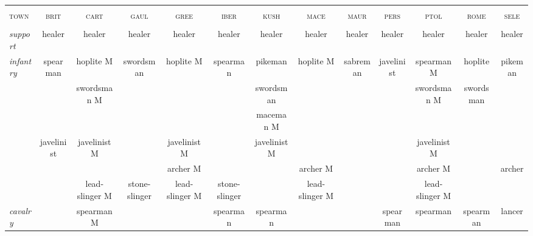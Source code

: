 \documentclass{article}
\newcommand{\brit}{\textsc{\color{blue} brit}}
\newcommand{\cart}{\textsc{\color{blue} cart}}
\newcommand{\gaul}{\textsc{\color{blue} gaul}}
\newcommand{\gree}{\textsc{\color{blue} gree}}
\newcommand{\iber}{\textsc{\color{blue} iber}}
\newcommand{\kush}{\textsc{\color{blue} kush}}
\newcommand{\mace}{\textsc{\color{blue} mace}}
\newcommand{\maur}{\textsc{\color{blue} maur}}
\newcommand{\pers}{\textsc{\color{blue} pers}}
\newcommand{\ptol}{\textsc{\color{blue} ptol}}
\newcommand{\rome}{\textsc{\color{blue} rome}}
\newcommand{\sele}{\textsc{\color{blue} sele}}
\newcommand{\town}{\textsc{\color{blue} town}}
\begin{document}
\begin{landscape}
\begin{tabular}{l||c|c|c|c||c|c|c|c||c|c|c|c}
\hline
\hline
 &                &                &                &                &                &                &                &                &                &                &                &                \\
\town %
 & \brit          & \cart          & \gaul          & \gree          & \iber          & \kush          & \mace          & \maur          & \pers          & \ptol          & \rome          & \sele          \\
 &                &                &                &                &                &                &                &                &                &                &                &                \\
\hline
\hline\textit{support}
 & healer         & healer         & healer         & healer         & healer         & healer         & healer         & healer         & healer         & healer         & healer         & healer         \\
\hline\textit{infantry}
 & spearman       & hoplite M      & swordsman      & hoplite M      & spearman       & pikeman        & hoplite M      & sabreman       & javelinist     & spearman M     & hoplite        & pikeman        \\
 &                & swordsman M    &                &                &                & swordsman      &                &                &                & swordsman M    & swordsman      &                \\
 &                &                &                &                &                & maceman M      &                &                &                &                &                &                \\
 & javelinist     & javelinist M   &                & javelinist M   &                & javelinist M   &                &                &                & javelinist M   &                &                \\
 &                &                &                & archer M       &                &                & archer M       &                &                & archer M       &                & archer         \\
 &                & lead-slinger M & stone-slinger  & lead-slinger M & stone-slinger  &                & lead-slinger M &                &                & lead-slinger M &                &                \\
\hline\textit{cavalry}
 &                & spearman M     &                &                & spearman       & spearman       &                &                & spearman       & spearman       & spearman       & lancer         \\

\end{tabular}
\end{landscape}
\end{document}
